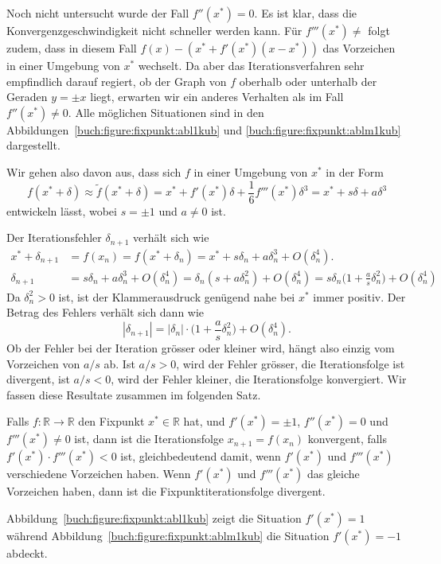 Noch nicht untersucht wurde der Fall $f''(x^*)=0$.
Es ist klar, dass die Konvergenzgeschwindigkeit nicht schneller
werden kann.
%
Für $f'''(x^*)\ne $ folgt zudem, dass in diesem Fall
$f(x)-(x^* + f'(x^*)(x-x^*))$
das Vorzeichen in einer Umgebung von $x^*$ wechselt.
Da aber das Iterationsverfahren sehr empfindlich darauf regiert, ob
der Graph von $f$ oberhalb oder unterhalb der Geraden $y=\pm x$ 
liegt, erwarten wir ein anderes Verhalten als im Fall $f''(x^*)\ne 0$.
%
Alle möglichen Situationen sind in den
Abbildungen~\ref{buch:figure:fixpunkt:abl1kub} und
\ref{buch:figure:fixpunkt:ablm1kub} dargestellt.

Wir gehen also davon aus, dass sich $f$ in einer Umgebung von $x^*$
in der Form
\[
f(x^*+\delta)
\approx
\tilde{f}(x^*+\delta)
=
x^* + f'(x^*)\delta + \frac1{6}f'''(x^*) \delta^3
=
x^* + s\delta + a\delta^3
\]
entwickeln lässt, wobei $s=\pm 1$ und $a\ne 0$ ist.

Der Iterationsfehler $\delta_{n+1}$ verhält sich wie
\begin{align*}
x^* + \delta_{n+1}
&=
f(x_n)
=
f(x^* + \delta_n)
=
x^* + s\delta_n + a\delta_n^3 + O(\delta_n^4).
\\
\delta_{n+1}
&=
s\delta_n + a\delta_n^3 + O(\delta_n^4)
=
\delta_n(s+a\delta_n^2) + O(\delta_n^4)
=
s\delta_n\biggl(1+\frac{a}{s}\delta_n^2\biggr) + O(\delta_n^4)
\end{align*}
Da $\delta_n^2>0$ ist, ist der Klammerausdruck genügend nahe bei $x^*$
immer positiv.
Der Betrag des Fehlers verhält sich dann wie
\[
|\delta_{n+1}|
=
|\delta_n| \cdot \biggl(1 + \frac{a}{s}\delta_n^2\biggr) + O(\delta_n^4).
\]
Ob der Fehler bei der Iteration grösser oder kleiner wird, hängt also
einzig vom Vorzeichen von $a/s$ ab.
Ist $a/s > 0$, wird der Fehler grösser, die Iterationsfolge ist divergent,
ist $a/s < 0$, wird der Fehler kleiner, die Iterationsfolge konvergiert.
Wir fassen diese Resultate zusammen im folgenden Satz.

\begin{satz}
Falls $f\colon\mathbb R\to\mathbb R$ den Fixpunkt $x^*\in\mathbb R$ hat,
und $f'(x^*)=\pm1$, $f''(x^*)=0$ und $f'''(x^*)\ne 0$ ist, dann ist die
Iterationsfolge $x_{n+1}=f(x_n)$ konvergent, falls $f'(x^*)\cdot f'''(x^*)<0$
ist, gleichbedeutend damit, wenn $f'(x^*)$ und $f'''(x^*)$ verschiedene
Vorzeichen haben.
Wenn $f'(x^*)$ und $f'''(x^*)$ das gleiche Vorzeichen haben, dann ist
die Fixpunktiterationsfolge divergent.
\end{satz}

Abbildung~\ref{buch:figure:fixpunkt:abl1kub} zeigt die Situation $f'(x^*)=1$
während Abbildung~\ref{buch:figure:fixpunkt:ablm1kub} die Situation
$f'(x^*)=-1$ abdeckt.

